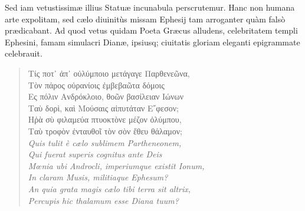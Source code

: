 \documentclass[a4paper, 11pt, oneside, polutonikogreek, latin]{article}
\begin{document}
Sed iam vetustissimæ illius Statuæ incunabula perscrutemur. Hanc non humana arte expolitam, sed cælo diuinitùs missam Ephesij tam arroganter quàm falsò prædicabant. Ad quod vetus quidam Poeta Græcus alludens, celebritatem templi Ephesini, famam simulacri Dianæ, ipsiusq; ciuitatis gloriam eleganti epigrammate celebrauit.
\begin{quote}
\hspace*{0mm}Τίς ποτ᾽ ἀπ᾽ οὐλύμποιο μετάγαγε Παρθενεῶνα,\\
\hspace*{5mm}Τὸν πάρος οὐρανίοις ἐμβεβαῶτα δόμοις\\
\hspace*{0mm}Ες πόλιν Ανδρόκλοιο, θοῶν βασίλειαν Ιώνων\\
\hspace*{5mm}Ταὺ δορὶ, καὶ Μούσαις αἰπυτάταν Ε῎φεσον;\\
\hspace*{0mm}Ηῥὰ σὺ φιλαμεύα πτυοκτὸνε μέζον ὀλύμπου,\\
\hspace*{5mm}Ταὺ τροφὸν ἐνταυθοῖ τὸν σὸν ἔθευ θάλαμον;\\

\hspace*{0mm}\emph{Quis tulit è cælo sublimem Partheneonem,}\\
\hspace*{5mm}\emph{Qui fuerat superis cognitus ante Deis}\\
\hspace*{0mm}\emph{Mœnia ubi Androcli, imperiumque existit Ionum,}\\
\hspace*{5mm}\emph{In claram Musis, militiaque Ephesum?}\\
\hspace*{0mm}\emph{An quia grata magis cælo tibi terra sit altrix,}\\
\hspace*{5mm}\emph{Percupis hic thalamum esse Diana tuum?}\\
\end{quote}
\vspace*{-8mm}
\end{document}
